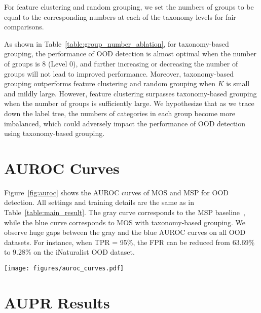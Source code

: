 \documentclass[final]{cvpr}
\begin{document}
\vspace{0.2cm}
For feature clustering and random grouping, we set the numbers of groups to be equal to the corresponding numbers at each of the taxonomy levels for fair comparisons.

As shown in Table~\ref{table:group_number_ablation}, for taxonomy-based grouping, the performance of OOD detection is almost optimal when the number of groups is 8 (Level 0), and further increasing or decreasing the number of groups will not lead to improved performance. Moreover, taxonomy-based grouping outperforms feature clustering and random grouping when $K$ is small and mildly large. However, feature clustering surpasses taxonomy-based grouping when the number of groups is sufficiently large. We hypothesize that as we trace down the label tree, the numbers of categories in each group become more imbalanced, which could adversely impact the performance of OOD detection using taxonomy-based grouping. 









\section{AUROC Curves}
\label{app:auroc}


Figure~\ref{fig:auroc} shows the AUROC curves of MOS and MSP for OOD detection. All settings and training details are the same as in Table~\ref{table:main_result}. The gray curve corresponds to the MSP baseline~\cite{hendrycks2016baseline}, while the blue curve corresponds to MOS with taxonomy-based grouping. We observe huge gaps between the gray and the blue AUROC curves on all OOD datasets. For instance, when TPR = 95\%, the FPR can be reduced from 63.69\% to 9.28\% on the iNaturalist OOD dataset.

\begin{figure*}[h]
    \centering
    \texttt{[image: figures/auroc\_curves.pdf]}
    \caption{\small{AUROC curves of MOS (blue) and MSP (gray) on four OOD datasets.}}
    \label{fig:auroc}
\end{figure*}

\section{AUPR Results}
\label{app:aupr}
\end{document}
